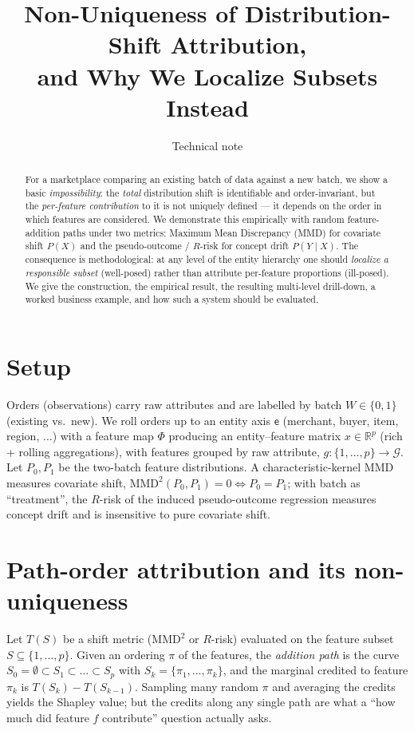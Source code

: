 \documentclass[11pt]{article}
\title{\textbf{Non-Uniqueness of Distribution-Shift Attribution,\\
and Why We Localize Subsets Instead}}
\author{Technical note}
\date{}
\newcommand{\R}{\mathbb{R}}
\newcommand{\MMD}{\mathrm{MMD}}
\newcommand{\Gcal}{\mathcal{G}}
\begin{document}
\maketitle

\begin{abstract}
For a marketplace comparing an existing batch of data against a new batch, we
show a basic \emph{impossibility}: the \emph{total} distribution shift is
identifiable and order-invariant, but the \emph{per-feature contribution} to it
is not uniquely defined --- it depends on the order in which features are
considered. We demonstrate this empirically with random feature-addition paths
under two metrics: Maximum Mean Discrepancy (MMD) for covariate shift $P(X)$ and
the pseudo-outcome / $R$-risk for concept drift $P(Y\mid X)$. The consequence is
methodological: at any level of the entity hierarchy one should \emph{localize a
responsible subset} (well-posed) rather than attribute per-feature proportions
(ill-posed). We give the construction, the empirical result, the resulting
multi-level drill-down, a worked business example, and how such a system should
be evaluated.
\end{abstract}

\section{Setup}

Orders (observations) carry raw attributes and are labelled by batch
$W\in\{0,1\}$ (existing vs.\ new). We roll orders up to an entity axis
$\mathsf e$ (merchant, buyer, item, region, $\dots$) with a feature map $\Phi$
producing an entity--feature matrix $x\in\R^{p}$ (rich + rolling aggregations),
with features grouped by raw attribute, $g:\{1,\dots,p\}\to\Gcal$. Let $P_0,P_1$
be the two-batch feature distributions. A characteristic-kernel MMD measures
covariate shift, $\MMD^2(P_0,P_1)=0\iff P_0=P_1$; with batch as ``treatment'',
the $R$-risk of the induced pseudo-outcome regression measures concept drift and
is insensitive to pure covariate shift.

\section{Path-order attribution and its non-uniqueness}

Let $T(S)$ be a shift metric ($\MMD^2$ or $R$-risk) evaluated on the feature
subset $S\subseteq\{1,\dots,p\}$. Given an ordering $\pi$ of the features, the
\emph{addition path} is the curve $S_0=\emptyset\subset S_1\subset\dots\subset
S_p$ with $S_k=\{\pi_1,\dots,\pi_k\}$, and the marginal credited to feature
$\pi_k$ is $T(S_k)-T(S_{k-1})$. Sampling many random $\pi$ and averaging the
credits yields the Shapley value; but the credits along any single path are what
a ``how much did feature $f$ contribute'' question actually asks.
\end{document}
